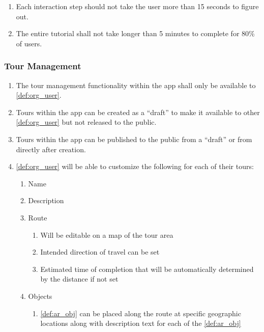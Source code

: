\documentclass{article}
\begin{document}
\begin{enumerate}[align=left, label=\textbf{TU-NFR\arabic*:}]
    \item Each interaction step should not take the user more than 15 seconds to figure out.
    \item The entire tutorial shall not take longer than 5 minutes to complete for 80\% of users.
\end{enumerate}

\subsubsection{Tour Management}
\label{ssub:tour_management}

\begin{enumerate}[align=left, label=\textbf{TM-FR\arabic*:}]
    \item The tour management functionality within the app shall only be available to \ref{def:org_user}.
    \item Tours within the app can be created as a “draft” to make it available to other \ref{def:org_user} but not released to the public.
    \item Tours within the app can be published to the public from a “draft” or from directly after creation.
    \item \ref{def:org_user} will be able to customize the following for each of their tours:
          \begin{enumerate}
              \item Name
              \item Description
              \item Route
                    \begin{enumerate}
                        \item Will be editable on a map of the tour area
                        \item Intended direction of travel can be set
                        \item Estimated time of completion that will be automatically determined by the distance if not set
                    \end{enumerate}
              \item Objects
                    \begin{enumerate}
                        \item \ref{def:ar_obj} can be placed along the route at specific geographic locations along with description text for each of the \ref{def:ar_obj}

\end{enumerate}
\end{enumerate}
\end{enumerate}
\end{document}
